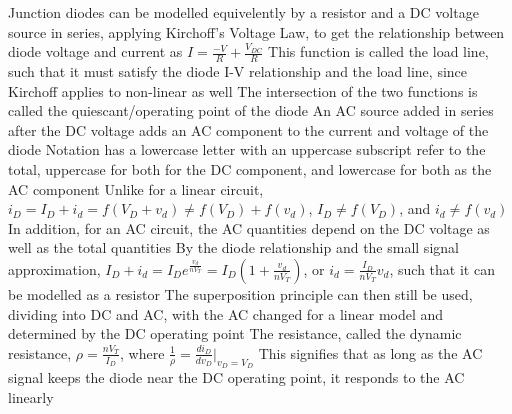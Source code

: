 \documentclass[11 pt, twoside]{article}
\newenvironment{outline*}
{
	\begin{outline}[enumerate]
	}
	{\end{outline}
}
\begin{document}
\begin{outline*}
	\2 Junction diodes can be modelled equivelently by a resistor and a DC voltage source in series, applying Kirchoff's Voltage Law, to get the relationship between diode voltage and current as $I = \frac{-V}{R} + \frac{V_{DC}}{R}$
		\3 This function is called the load line, such that it must satisfy the diode I-V relationship and the load line, since Kirchoff applies to non-linear as well
			\4 The intersection of the two functions is called the quiescant/operating point of the diode
		\3 An AC source added in series after the DC voltage adds an AC component to the current and voltage of the diode
			\4 Notation has a lowercase letter with an uppercase subscript refer to the total, uppercase for both for the DC component, and lowercase for both as the AC component
			\4 Unlike for a linear circuit, $i_D = I_D + i_d = f(V_D + v_d) \neq f(V_D) + f(v_d)$, $I_D \neq f(V_D)$, and $i_d \neq f(v_d)$
			\4 In addition, for an AC circuit, the AC quantities depend on the DC voltage as well as the total quantities
		\3 By the diode relationship and the small signal approximation, $I_D + i_d = I_De^{\frac{v_d}{nV_T}} = I_D(1 + \frac{v_d}{nV_T})$, or $i_d = \frac{I_D}{nV_T}v_d$, such that it can be modelled as a resistor
			\4 The superposition principle can then still be used, dividing into DC and AC, with the AC changed for a linear model and determined by the DC operating point
			\4 The resistance, called the dynamic resistance, $\rho = \frac{nV_T}{I_D}$, where $\frac{1}{\rho} = \frac{di_D}{dv_D}|_{v_D = V_D}$
			\4 This signifies that as long as the AC signal keeps the diode near the DC operating point, it responds to the AC linearly
\end{outline*}
\end{document}
